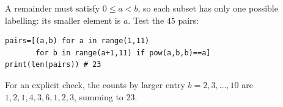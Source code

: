 A remainder must satisfy $0\le a<b$, so each subset has only one possible labelling: its smaller element is $a$. Test the $45$ pairs:
\begin{verbatim}
pairs=[(a,b) for a in range(1,11)
       for b in range(a+1,11) if pow(a,b,b)==a]
print(len(pairs)) # 23
\end{verbatim}
For an explicit check, the counts by larger entry $b=2,3,\ldots,10$ are $1,2,1,4,3,6,1,2,3$, summing to $\boxed{23}$.
